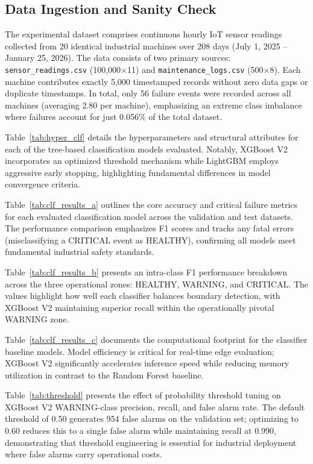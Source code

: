 \documentclass[conference]{IEEEtran}
\begin{document}
\subsection{Data Ingestion and Sanity Check}
The experimental dataset comprises continuous hourly IoT sensor readings collected from 20 identical industrial machines over 208 days (July 1, 2025 – January 25, 2026). The data consists of two primary sources: \texttt{sensor\_readings.csv} (100,000$\times$11) and \texttt{maintenance\_logs.csv} (500$\times$8). Each machine contributes exactly 5,000 timestamped records without zero data gaps or duplicate timestamps. In total, only 56 failure events were recorded across all machines (averaging 2.80 per machine), emphasizing an extreme class imbalance where failures account for just 0.056\% of the total dataset.

Table~\ref{tab:hyper_clf} details the hyperparameters and structural attributes for each of the tree-based classification models evaluated. Notably, XGBoost V2 incorporates an optimized threshold mechanism while LightGBM employs aggressive early stopping, highlighting fundamental differences in model convergence criteria.

Table~\ref{tab:clf_results_a} outlines the core accuracy and critical failure metrics for each evaluated classification model across the validation and test datasets. The performance comparison emphasizes F1 scores and tracks any fatal errors (misclassifying a CRITICAL event as HEALTHY), confirming all models meet fundamental industrial safety standards.

Table~\ref{tab:clf_results_b} presents an intra-class F1 performance breakdown across the three operational zones: HEALTHY, WARNING, and CRITICAL. The values highlight how well each classifier balances boundary detection, with XGBoost V2 maintaining superior recall within the operationally pivotal WARNING zone.

Table~\ref{tab:clf_results_c} documents the computational footprint for the classifier baseline models. Model efficiency is critical for real-time edge evaluation; XGBoost V2 significantly accelerates inference speed while reducing memory utilization in contrast to the Random Forest baseline.

Table~\ref{tab:threshold} presents the effect of probability threshold tuning on XGBoost V2 WARNING-class precision, recall, and false alarm rate. The default threshold of 0.50 generates 954 false alarms on the validation set; optimizing to 0.60 reduces this to a single false alarm while maintaining recall at 0.990, demonstrating that threshold engineering is essential for industrial deployment where false alarms carry operational costs.
\end{document}
